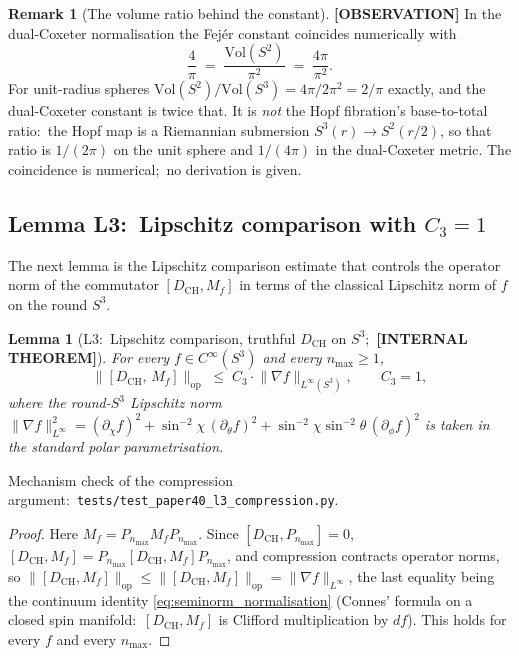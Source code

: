 \documentclass[11pt,a4paper]{article}
\theoremstyle{plain}
\newtheorem{lemma}[theorem]{Lemma}
\theoremstyle{definition}
\newtheorem{remark}[theorem]{Remark}
\newcommand{\nmax}{n_{\max}}
\newcommand{\sthree}{S^{3}}
\newcommand{\opnorm}[1]{\lVert #1 \rVert_{\mathrm{op}}}
\newcommand{\norm}[1]{\lVert #1 \rVert}
\newcommand{\Vol}{\mathrm{Vol}}
\newcommand{\Mat}{M}
\newcommand{\DCH}{D_{\mathrm{CH}}}
\begin{document}
\begin{remark}[The volume ratio behind the constant]
\textbf{[OBSERVATION]} In the dual-Coxeter normalisation the Fej\'er
constant coincides numerically with
\begin{equation*}
   \frac{4}{\pi}
   \;=\; \frac{\Vol(S^2)}{\pi^2}
   \;=\; \frac{4\pi}{\pi^2}.
\end{equation*}
For unit-radius spheres $\Vol(S^2)/\Vol(\sthree) = 4\pi/2\pi^2 = 2/\pi$ exactly, and the dual-Coxeter constant is twice that.  It is \emph{not} the Hopf fibration's base-to-total ratio:\ the Hopf map is a Riemannian submersion $\sthree(r) \to S^2(r/2)$, so that ratio is $1/(2\pi)$ on the unit sphere and $1/(4\pi)$ in the dual-Coxeter metric.  The coincidence is numerical;\ no derivation is given.
\end{remark}

\subsection{Lemma L3:\ Lipschitz comparison with $C_3 = 1$}
\label{sec:L3}

The next lemma is the Lipschitz comparison estimate that controls the
operator norm of the commutator $[\DCH, \Mat_f]$ in terms of the
classical Lipschitz norm of $f$ on the round $\sthree$.

\begin{lemma}[L3:\ Lipschitz comparison, truthful $\DCH$ on $\sthree$;\
\textbf{[INTERNAL THEOREM]}]
\label{lem:L3}
For every $f \in C^\infty(\sthree)$ and every $\nmax \ge 1$,
\begin{equation}\label{eq:L3_main}
   \opnorm{[\DCH,\, \Mat_f]}
   \;\le\; C_3 \cdot \norm{\nabla f}_{L^\infty(\sthree)}, \qquad
   C_3 = 1,
\end{equation}
where the round-$\sthree$ Lipschitz norm
$\norm{\nabla f}_{L^\infty}^2 = (\partial_\chi f)^2 + \sin^{-2}\chi\,
(\partial_\theta f)^2 + \sin^{-2}\chi \sin^{-2}\theta\, (\partial_\phi f)^2$
is taken in the standard polar parametrisation.
\end{lemma}

\noindent Mechanism check of the compression argument:\
\texttt{tests/test\_paper40\_l3\_compression.py}.

\begin{proof}
Here $\Mat_f = P_{\nmax} M_f P_{\nmax}$.  Since $[\DCH, P_{\nmax}] = 0$,
$[\DCH, \Mat_f] = P_{\nmax}[\DCH, M_f]P_{\nmax}$, and compression
contracts operator norms, so $\opnorm{[\DCH, \Mat_f]} \le
\opnorm{[\DCH, M_f]} = \norm{\nabla f}_{L^\infty}$, the last equality
being the continuum identity \eqref{eq:seminorm_normalisation} (Connes'
formula on a closed spin manifold:\ $[\DCH, M_f]$ is Clifford
multiplication by $df$).  This holds for every $f$ and every $\nmax$.
\end{proof}
\end{document}
